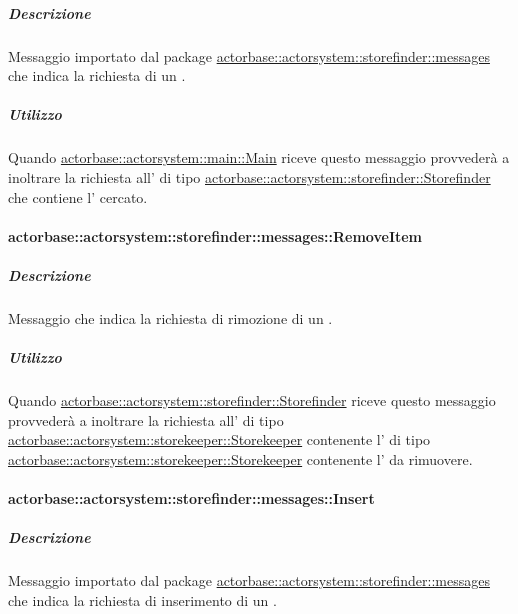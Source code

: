 \documentclass{scalatekids-article}
\begin{document}
\subparagraph{Descrizione}

Messaggio importato dal package \hyperref[sec:actorbase::actorsystem::storefinder::messages]{actorbase::\allowbreak{}actorsystem::\allowbreak{}storefinder::\allowbreak{}messages}
che indica la richiesta di un .

\subparagraph{Utilizzo}

Quando \hyperref[sec:actorbase::actorsystem::main::Main]{actorbase::\allowbreak{}actorsystem::\allowbreak{}main::\allowbreak{}Main}
riceve questo messaggio provvederà a inoltrare la richiesta all' di tipo
\hyperref[sec:actorbase::actorsystem::storefinder::Storefinder]{actorbase::\allowbreak{}actorsystem::\allowbreak{}storefinder::\allowbreak{}Storefinder}
che contiene l' cercato.

\paragraph{actorbase::actorsystem::storefinder::messages::RemoveItem}
\label{sec:actorbase::actorsystem::storefinder::messages::RemoveItem}

\subparagraph{Descrizione}

Messaggio che indica la richiesta di rimozione di un .

\subparagraph{Utilizzo}

Quando \hyperref[sec:actorbase::actorsystem::storefinder::Storefinder]{actorbase::\allowbreak{}actorsystem::\allowbreak{}storefinder::\allowbreak{}Storefinder}
riceve questo messaggio provvederà a inoltrare la richiesta all' di tipo
\hyperref[sec:actorbase::actorsystem::storekeeper::Storekeeper]{actorbase::\allowbreak{}actorsystem::\allowbreak{}storekeeper::\allowbreak{}Storekeeper}
contenente l' di tipo
\hyperref[sec:actorbase::actorsystem::storekeeper::Storekeeper]{actorbase::\allowbreak{}actorsystem::\allowbreak{}storekeeper::\allowbreak{}Storekeeper}
contenente l' da rimuovere.

\paragraph{actorbase::actorsystem::storefinder::messages::Insert}
\label{sec:actorbase::actorsystem::storefinder::messages::Insert}

\subparagraph{Descrizione}

Messaggio importato dal package \hyperref[sec:actorbase::actorsystem::storefinder::messages]{actorbase::\allowbreak{}actorsystem::\allowbreak{}storefinder::\allowbreak{}messages}
che indica la richiesta di inserimento di un .
\end{document}
